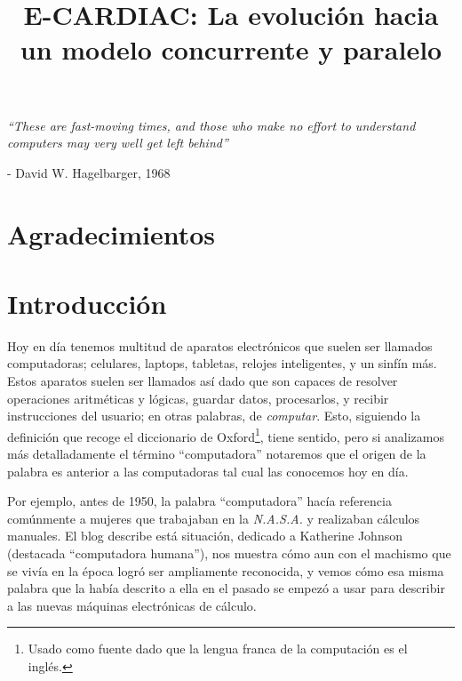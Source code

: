\documentclass[letterpaper,12pt,oneside]{book}
\title{E-CARDIAC: La evolución hacia un modelo concurrente y paralelo}
\begin{document}
	\frontmatter
	\pagestyle{plain} %

    

\chapter*{}
\begin{flushright}%
  \emph{``These are fast-moving times, and those who make no effort to understand computers may very well get left behind''}
  
  
  - David W. Hagelbarger, 1968
\end{flushright}

\chapter*{Agradecimientos}


\chapter{Introducción}

	Hoy en día tenemos multitud de aparatos electrónicos que suelen ser llamados computadoras; celulares, laptops, tabletas, relojes inteligentes, y un sinfín más. 
	Estos aparatos suelen ser llamados así dado que son capaces de resolver operaciones aritméticas y lógicas, guardar datos, procesarlos, y recibir instrucciones del 
	usuario; en otras palabras, de \textit{computar}. Esto, siguiendo la definición
	que recoge el diccionario de Oxford\footnote{Usado como fuente dado que la lengua franca de la computación es el inglés.}, tiene sentido,
	pero si analizamos más detalladamente el término ``computadora''  notaremos que el origen de la palabra es anterior a las computadoras
	tal cual las conocemos hoy en día.
	
	Por ejemplo, antes de 1950, la palabra ``computadora''  hacía referencia comúnmente a mujeres
	que trabajaban en la \textit{N.A.S.A.} y realizaban cálculos manuales. El blog \cite{nasa_who_2020} describe está situación, dedicado a Katherine Johnson (destacada ``computadora humana''), nos muestra cómo aun con el machismo que se vivía en la época logró ser ampliamente reconocida, y vemos cómo esa misma palabra que la había descrito a ella en el pasado
	se empezó a usar para describir a las nuevas máquinas electrónicas de cálculo.
\end{document}
